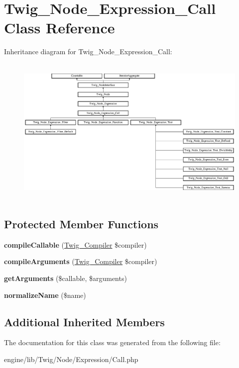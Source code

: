 \hypertarget{class_twig___node___expression___call}{}\section{Twig\+\_\+\+Node\+\_\+\+Expression\+\_\+\+Call Class Reference}
\label{class_twig___node___expression___call}
Inheritance diagram for Twig\+\_\+\+Node\+\_\+\+Expression\+\_\+\+Call\+:\begin{figure}[H]
\begin{center}
\leavevmode
\includegraphics[height=7.250996cm]{class_twig___node___expression___call}
\end{center}
\end{figure}
\subsection*{Protected Member Functions}
\begin{DoxyCompactItemize}
\item 
\hypertarget{class_twig___node___expression___call_a78758d281532d246d656412c244c4ecd}{}{\bfseries compile\+Callable} (\hyperlink{class_twig___compiler}{Twig\+\_\+\+Compiler} \$compiler)\label{class_twig___node___expression___call_a78758d281532d246d656412c244c4ecd}

\item 
\hypertarget{class_twig___node___expression___call_ab86d2b3f8c992934baab01f91e77deb2}{}{\bfseries compile\+Arguments} (\hyperlink{class_twig___compiler}{Twig\+\_\+\+Compiler} \$compiler)\label{class_twig___node___expression___call_ab86d2b3f8c992934baab01f91e77deb2}

\item 
\hypertarget{class_twig___node___expression___call_a3546f967ad32236268c7e2ef810b707a}{}{\bfseries get\+Arguments} (\$callable, \$arguments)\label{class_twig___node___expression___call_a3546f967ad32236268c7e2ef810b707a}

\item 
\hypertarget{class_twig___node___expression___call_a565b09107e424878dd2adaa4231ad84d}{}{\bfseries normalize\+Name} (\$name)\label{class_twig___node___expression___call_a565b09107e424878dd2adaa4231ad84d}

\end{DoxyCompactItemize}
\subsection*{Additional Inherited Members}


The documentation for this class was generated from the following file\+:\begin{DoxyCompactItemize}
\item 
engine/lib/\+Twig/\+Node/\+Expression/Call.\+php\end{DoxyCompactItemize}
